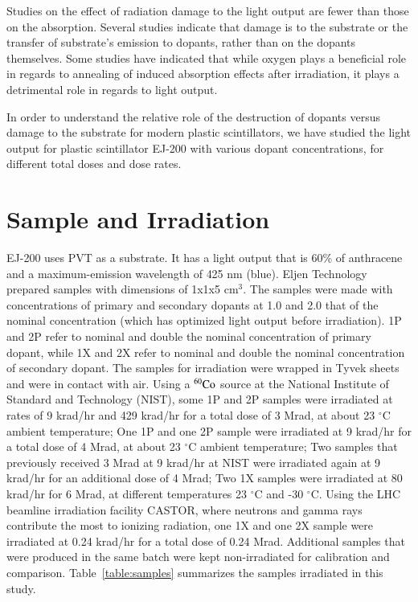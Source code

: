 \documentclass[review]{elsarticle}
\begin{document}
Studies on the effect of radiation damage to the light output are fewer than those on the absorption. 
Several studies indicate that damage is to the substrate or the transfer of substrate's emission to dopants, 
rather than on the dopants themselves.
Some studies have indicated that while oxygen plays a beneficial role in regards to annealing of induced absorption effects after 
irradiation, it plays a detrimental role in regards to light output\cite{Biagtan1996125}. 

In order to understand the relative role of the destruction of dopants versus damage to the substrate for modern plastic scintillators, 
we have studied the light output for plastic scintillator EJ-200 with various dopant concentrations, 
for different total doses and dose rates. 

\section{Sample and Irradiation}
EJ-200 uses PVT as a substrate. It has a light output that is 60\% of anthracene and a maximum-emission wavelength of 425 nm (blue). 
Eljen Technology prepared samples with dimensions of 1x1x5 cm$^{3}$. 
The samples were made with concentrations of primary and secondary dopants at 1.0 and 2.0 that of 
the nominal concentration (which has optimized light output before irradiation). 
1P and 2P refer to nominal and double the nominal concentration of primary dopant, 
while 1X and 2X refer to nominal and double the nominal concentration of secondary dopant.
The samples for irradiation were wrapped in Tyvek sheets and were in contact with air.
Using a $\rm {^{60}Co}$ source at the National Institute of Standard and Technology (NIST), some 1P and 2P samples were irradiated 
at rates of 9 krad/hr and 429 krad/hr for a total dose of 3 Mrad, at about 23 $^\circ$C ambient temperature;  
One 1P and one 2P sample were irradiated at 9 krad/hr for a total dose of 4 Mrad, at about 23 $^\circ$C ambient temperature; 
Two samples that previously received 3 Mrad at 9 krad/hr at NIST were irradiated again at 9 krad/hr for an additional dose of 4 Mrad;
Two 1X samples were irradiated at 80 krad/hr for 6 Mrad, at different temperatures 23 $^\circ$C and -30 $^\circ$C.
Using the LHC beamline irradiation facility CASTOR, where neutrons and gamma rays contribute the most to ionizing radiation, 
one 1X and one 2X sample were irradiated at 0.24 krad/hr for a total dose of 0.24 Mrad. 
Additional samples that were produced in the same batch were kept non-irradiated for calibration and comparison.
Table~\ref{table:samples} summarizes the samples irradiated in this study.
\end{document}
